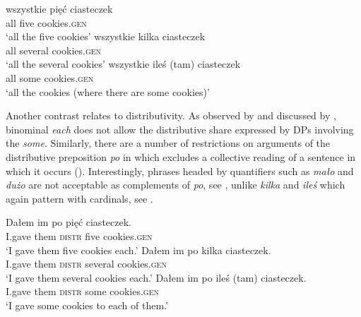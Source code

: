 \documentclass[output=paper, newtxmath, colorlinks, citecolor=brown]{langsci/langscibook}
\begin{document}
	\ea \label{ex:universal-quantifier-cardinals} \ea \gll wszystkie pięć ciasteczek\\
	all five cookies.\textsc{gen}\\
	\glt `all the five cookies'
	\ex \gll wszystkie kilka ciasteczek\\
	all several cookies.\textsc{gen}\\
	\glt `all the several cookies'
	\ex \gll wszystkie {ileś (tam)} ciasteczek\\
	all some cookies.\textsc{gen}\\
	\glt `all the cookies (where there are some cookies)'
	\z
    \z

	\ea \label{ex:universal-quantifier-malo} 
	\z
    \z

	\noindent Another contrast relates to distributivity. As observed by \cite{safir_stowell1988binominal} and discussed by \cite{borer2005name},  binominal \textit{each} does not allow the distributive share expressed by DPs involving the  \textit{some}. Similarly, there are a number of restrictions on arguments of the distributive preposition \textit{po} in  which excludes a collective reading of a sentence in which it occurs (\citealt{przepiorkowski2008generalised}). Interestingly, phrases headed by quantifiers such as \textit{mało} and \textit{dużo} are not acceptable as complements of \textit{po}, see , unlike \textit{kilka} and \textit{ileś} which again pattern with cardinals, see .

	\ea \label{ex:distributive-po-cardinals} \ea \gll Dałem im po pięć ciasteczek.\\
	I.gave them \textsc{distr} five cookies.\textsc{gen}\\
	\glt `I gave them five cookies each.'
	\ex \gll Dałem im po kilka ciasteczek.\\
	I.gave them \textsc{distr} several cookies.\textsc{gen}\\
	\glt `I gave them several cookies each.'
	\ex \gll Dałem im po {ileś (tam)} ciasteczek.\\
	I.gave them \textsc{distr} some cookies.\textsc{gen}\\
	\glt `I gave some cookies to each of them.'
	\z
    \z
\end{document}
